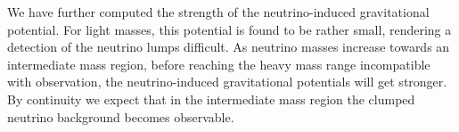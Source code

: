 We have further computed the strength of the neutrino-induced gravitational
potential. For light masses, this potential is found to be rather
small, rendering a detection of the neutrino lumps difficult. As neutrino
masses increase towards an intermediate mass region, before reaching
the heavy mass range incompatible with observation, the neutrino-induced
gravitational potentials will get stronger. By continuity we expect
that in the intermediate mass region the clumped neutrino background
becomes observable. 
\done{}




%
%

